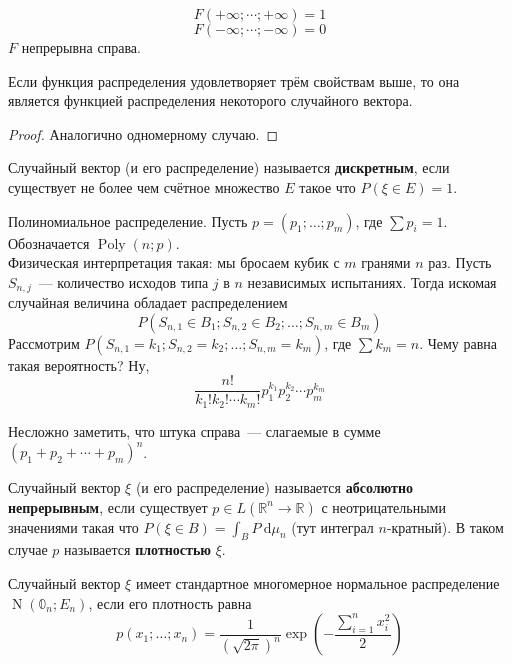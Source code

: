 \documentclass{article}
\begin{document}
    \begin{property}
        $$F(+\infty;\cdots;+\infty)=1$$
        $$F(-\infty;\cdots;-\infty)=0$$
        $F$ непрерывна справа.
    \end{property}
    \begin{theorem}
        Если функция распределения удовлетворяет трём свойствам выше, то она является функцией распределения некоторого случайного вектора.
    \end{theorem}
    \begin{proof}
        Аналогично одномерному случаю.
    \end{proof}
    \begin{definition}
        Случайный вектор (и его распределение) называется \textbf{дискретным}, если существует не более чем счётное множество $E$ такое что $P(\xi\in E)=1$.
    \end{definition}
    \begin{example}
        \label{Poly}
        Полиномиальное распределение. Пусть $p=(p_1;\ldots;p_m)$, где $\sum p_i=1$. Обозначается $\operatorname{Poly}(n;p)$.\\
        Физическая интерпретация такая: мы бросаем кубик с $m$ гранями $n$ раз. Пусть $S_{n,j}$~--- количество исходов типа $j$ в $n$ независимых испытаниях. Тогда искомая случайная величина обладает распределением
        $$
        P(S_{n,1}\in B_1;S_{n,2}\in B_2;\ldots;S_{n,m}\in B_m)
        $$
        Рассмотрим $P(S_{n,1}=k_1;S_{n,2}=k_2;\ldots;S_{n,m}=k_m)$, где $\sum k_m=n$. Чему равна такая вероятность? Ну,
        $$
        \frac{n!}{k_1!k_2!\cdots k_m!}p_1^{k_1}p_2^{k_2}\cdots p_m^{k_m}
        $$
    \end{example}
    \begin{remark}
        Несложно заметить, что штука справа~--- слагаемые в сумме $(p_1+p_2+\cdots+p_m)^n$.
    \end{remark}
    \begin{definition}
        Случайный вектор $\xi$ (и его распределение) называется \textbf{абсолютно непрерывным}, если существует $p\in L(\mathbb R^n\to\mathbb R)$ с неотрицательными значениями такая что $P(\xi\in B)=\int_BP~\mathrm d\mu_n$ (тут интеграл $n$-кратный). В таком случае $p$ называется \textbf{плотностью} $\xi$.
    \end{definition}
    \begin{example}
        Случайный вектор $\xi$ имеет стандартное многомерное нормальное распределение $\operatorname{N}(\mathbb0_n;E_n)$, если его плотность равна
        $$
        p(x_1;\ldots;x_n)=\frac1{(\sqrt{2\pi})^n}\exp\left(-\frac{\sum\limits_{i=1}^nx_i^2}2\right)
        $$
    \end{example}
\end{document}
